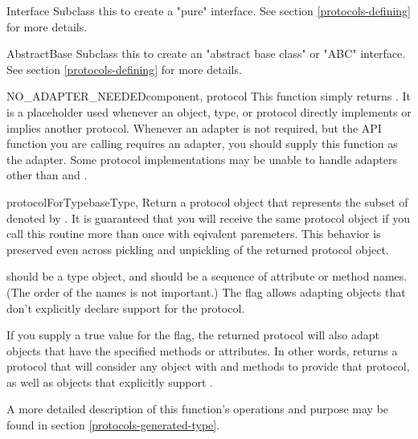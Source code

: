 \begin{verbatim%
}
\begin{verbatim%
}
\begin{verbatim%
}
\begin{verbatim%
}
\begin{verbatim%
}
\begin{verbatim%
}
\begin{classdesc*}{Interface}
Subclass this to create a "pure" interface.  See section \ref{protocols-defining}
for more details.
\end{classdesc*}

\begin{classdesc*}{AbstractBase}
Subclass this to create an "abstract base class" or "ABC" interface.  See
section \ref{protocols-defining} for more details.
\end{classdesc*}



\begin{funcdesc}{NO_ADAPTER_NEEDED}{component, protocol}
This function simply returns .  It is a placeholder used whenever
an object, type, or protocol directly implements or implies another protocol.
Whenever an adapter is not required, but the  API function
you are calling requires an adapter, you should supply this function as the
adapter.  Some protocol implementations may be unable to handle adapters other
than  and .
\end{funcdesc}

\begin{funcdesc}{protocolForType}{baseType,
} 
Return a protocol object that represents the subset of  denoted
by .  It is guaranteed that you will receive the same protocol
object if you call this routine more than once with eqivalent paremeters.  This
behavior is preserved even across pickling and unpickling of the returned
protocol object.

 should be a type object, and  should be a sequence
of attribute or method names.  (The order of the names is not important.)  The
 flag allows adapting objects that don't explicitly declare
support for the protocol.

If you supply a true value for the  flag, the returned protocol
will also adapt objects that have the specified methods or attributes.  In
other words,  returns a
protocol that will consider any object with  and 
methods to provide that protocol, as well as objects that explicitly support
.

A more detailed description of this function's operations and purpose may be
found in section \ref{protocols-generated-type}.


\end{funcdesc}
\end{verbatim%
}
\end{verbatim%
}
\end{verbatim%
}
\end{verbatim%
}
\end{verbatim%
}
\end{verbatim%
}
